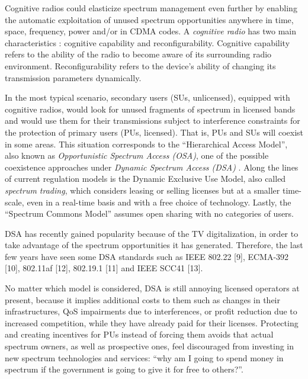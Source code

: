 Cognitive radios \cite{ref:Mitola1999} could elasticize spectrum management even further by enabling the automatic exploitation of unused spectrum opportunities anywhere in time, space, frequency, power and/or in CDMA codes.
A \emph{cognitive radio} has two main characteristics \cite{ref:Akyildiz2006}: cognitive capability and reconfigurability. 
Cognitive capability refers to the ability of the radio to become aware of its surrounding radio environment. Reconfigurability refers to the device's ability of changing its transmission parameters dynamically.

In the most typical scenario, secondary users (SUs, unlicensed), equipped with cognitive radios, would look for unused fragments of spectrum in licensed bands and would use them for their transmissions subject to interference constraints for the protection of primary users (PUs, licensed). That is, PUs and SUs will coexist in some areas.
This situation corresponds to the “Hierarchical Access Model”, also known as \emph{Opportunistic Spectrum Access (OSA)}, one of the possible coexistence approaches under \emph{Dynamic Spectrum Access (DSA)} \cite{ref:Zhao2007_sur}. 
Along the lines of current regulation models is the Dynamic Exclusive Use Model, also called \emph{spectrum trading}, which considers leasing or selling licenses but at a smaller time-scale, even in a real-time basis and with a free choice of technology.
Lastly, the “Spectrum Commons Model”  assumes open sharing with no categories of users.

DSA has recently gained popularity because of the TV digitalization, in order to take advantage of the spectrum opportunities it has generated. %
Therefore, the last few years have seen some DSA standards such as IEEE 802.22 [9], ECMA-392 [10], 802.11af [12], 802.19.1 [11] and IEEE SCC41 [13].

No matter which model is considered, DSA is still annoying licensed operators at present, because it implies additional costs to them such as changes in their infrastructures, QoS impairments due to interferences, or profit reduction due to increased competition, while they have already paid for their licenses.
Protecting and creating incentives for PUs instead of forcing them avoids that actual spectrum owners, as well as prospective ones, feel discouraged from investing in new spectrum technologies and services: \enquote{why am I going to spend money in spectrum if the government is going to give it for free to others?}.

